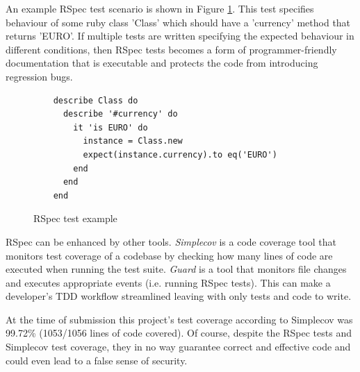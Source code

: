 An example RSpec test scenario is shown in Figure \ref{figure:RSpec}. This test
specifies behaviour of some ruby class 'Class' which should have a 'currency'
method that returns 'EURO'. If multiple tests are written specifying the
expected behaviour in different conditions, then RSpec tests becomes a form of
programmer-friendly documentation that is executable and protects the code from
introducing regression bugs.

\begin{figure}
  \begin{verbatim}
    describe Class do
      describe '#currency' do
        it 'is EURO' do
          instance = Class.new
          expect(instance.currency).to eq('EURO')
        end
      end
    end
  \end{verbatim}
  \caption{
    RSpec test example
    \label{figure:RSpec}
  }
\end{figure}

RSpec can be enhanced by other tools. \textit{Simplecov} \parencite{Simplecov}
is a code coverage tool that monitors test coverage of a codebase by checking
how many lines of code are executed when running the test suite. \textit{Guard}
\parencite{Guard} is a tool that monitors file changes and executes appropriate
events (i.e. running RSpec tests). This can make a developer's TDD workflow
streamlined leaving with only tests and code to write.

At the time of submission this project's test coverage according to Simplecov
was 99.72\% (1053/1056 lines of code covered). Of course, despite the RSpec
tests and Simplecov test coverage, they in no way guarantee correct and
effective code and could even lead to a false sense of security.
